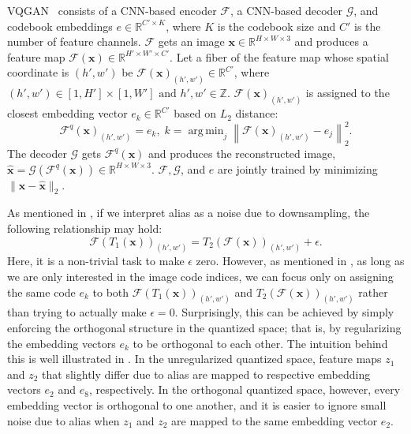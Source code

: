\documentclass{article}
\DeclareMathOperator*{\argmin}{arg\,min}
\begin{document}
VQGAN~\cite{esser2021taming} consists of a CNN-based encoder $\mathcal{F}$, a CNN-based decoder $\mathcal{G}$, and codebook embeddings $e \in \mathbb{R}^{C' \times K}$, where $K$ is the codebook size and $C'$ is the number of feature channels.
$\mathcal{F}$ gets an image $\mathbf{x} \in \mathbb{R}^{H \times W \times 3}$ and produces a feature map $\mathcal{F}(\mathbf{x}) \in \mathbb{R}^{H' \times W' \times C'}$. 
Let a fiber of the feature map whose spatial coordinate is $(h',w')$ be $\mathcal{F}(\mathbf{x})_{(h',w')} \in \mathbb{R}^{C'}$, where $(h',w') \in [1, H'] \times [1, W'] \text{ and } h',w' \in \mathbb{Z}$.
$\mathcal{F}(\mathbf{x})_{(h',w')}$ is assigned to the closest embedding vector $e_k \in \mathbb{R}^{C'}$ based on $L_2$ distance: 
\begin{equation}
\mathcal{F}^{q}(\mathbf{x})_{(h',w')} = e_k, \; k =\argmin_{j}\left\|\mathcal{F}(\mathbf{x})_{(h',w')}-e_{j}\right\|_{2}^{2}.
\end{equation}
The decoder $\mathcal{G}$ gets $\mathcal{F}^q(\mathbf{x})$ and produces the reconstructed image, $\hat{\mathbf{x}} = \mathcal{G}(\mathcal{F}^q(\mathbf{x})) \in \mathbb{R}^{H \times W \times 3}$. 
$\mathcal{F}, \mathcal{G}$, and $e$ are jointly trained by minimizing $\| \mathbf{x}-\hat{\mathbf{x}} \|_2$.

As mentioned in , if we interpret alias as a noise due to downsampling, the following relationship may hold:
\begin{equation}
  \mathcal{F}(T_1(\mathbf{x}))_{(h',w')} = T_2(\mathcal{F}(\mathbf{x}))_{(h',w')} + \epsilon.
\end{equation}
Here, it is a non-trivial task to make $\epsilon$ zero. However, as mentioned in , as long as we are only interested in the image code indices, we can focus only on assigning the same code $e_k$ to both $\mathcal{F}(T_1(\mathbf{x}))_{(h',w')}$ and $T_2(\mathcal{F}(\mathbf{x}))_{(h',w')}$ rather than trying to actually make $\epsilon = 0$.
Surprisingly, this can be achieved by simply enforcing the orthogonal structure in the quantized space; that is, by regularizing the embedding vectors $e_k$ to be orthogonal to each other.
The intuition behind this is well illustrated in .
In the unregularized quantized space, feature maps $z_1$ and $z_2$ that slightly differ due to alias are mapped to respective embedding vectors $e_2$ and $e_8$, respectively.
In the orthogonal quantized space, however, every embedding vector is orthogonal to one another, and it is easier to ignore small noise due to alias when $z_1$ and $z_2$ are mapped to the same embedding vector $e_2$.
\end{document}
